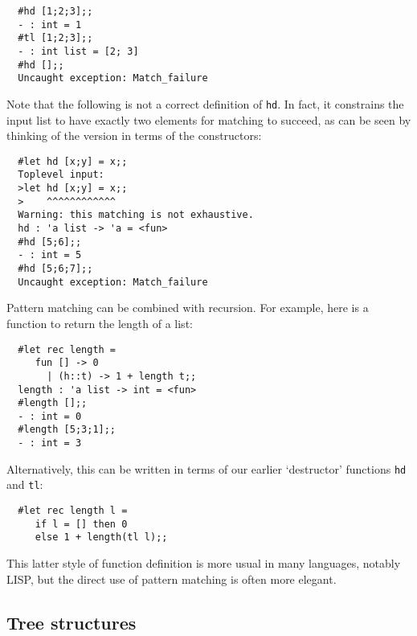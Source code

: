 \begin{boxed}\begin{verbatim}
  #hd [1;2;3];;
  - : int = 1
  #tl [1;2;3];;
  - : int list = [2; 3]
  #hd [];;
  Uncaught exception: Match_failure
\end{verbatim}\end{boxed}

Note that the following is not a correct definition of {\tt hd}. In fact, it
constrains the input list to have exactly two elements for matching to succeed,
as can be seen by thinking of the version in terms of the constructors:

\begin{boxed}\begin{verbatim}
  #let hd [x;y] = x;;
  Toplevel input:
  >let hd [x;y] = x;;
  >    ^^^^^^^^^^^^
  Warning: this matching is not exhaustive.
  hd : 'a list -> 'a = <fun>
  #hd [5;6];;
  - : int = 5
  #hd [5;6;7];;
  Uncaught exception: Match_failure
\end{verbatim}\end{boxed}

Pattern matching can be combined with recursion. For example, here is a
function to return the length of a list:

\begin{boxed}\begin{verbatim}
  #let rec length =
     fun [] -> 0
       | (h::t) -> 1 + length t;;
  length : 'a list -> int = <fun>
  #length [];;
  - : int = 0
  #length [5;3;1];;
  - : int = 3
\end{verbatim}\end{boxed}

Alternatively, this can be written in terms of our earlier `destructor'
functions {\tt hd} and {\tt tl}:

\begin{boxed}\begin{verbatim}
  #let rec length l =
     if l = [] then 0
     else 1 + length(tl l);;
\end{verbatim}\end{boxed}

This latter style of function definition is more usual in many languages,
notably LISP, but the direct use of pattern matching is often more elegant.

\subsection{Tree structures}

